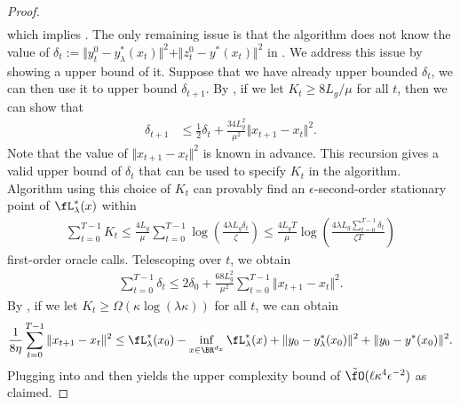 \begin{proof}
\begin{align}
\end{align}
which implies . The only remaining issue is that the algorithm does not know the value of $\delta_t:= \Vert y_t^0 - y_{\lambda}^*(x_t) \Vert^2 + \Vert z_t^0 - y^*(x_t) \Vert^2  $ in . We address this issue by showing a upper bound of it.
Suppose that we have already upper bounded $\delta_t$, we can then use it to upper bound $\delta_{t+1}$.
By , if we let $K_t \ge 8L_g/\mu$ for all $t$, then we can show that
\begin{align*} 
     \delta_{t+1}
    &\le \frac{1}{2} \delta_t +\frac{34 L_g^2}{\mu^2} \Vert x_{t+1} - x_t \Vert^2.
\end{align*}
Note that the value of $\Vert x_{t+1} - x_t \Vert^2$ is known in advance. This recursion gives a valid upper bound of $\delta_t$ that can be used to specify $K_t$ in the algorithm. 
Algorithm using this choice of $K_t$ can provably find an $\epsilon$-second-order stationary point of $\fL_{\lambda}^*(x)$ within 
\begin{align} \label{plug:2}
\sum_{t=0}^{T-1} K_t \le \frac{4L_g}{\mu} \sum_{t=0}^{T-1} \log \left( 
\frac{4 \lambda L_g \delta_t}{\zeta}
\right)   \le \frac{4L_g T}{\mu} \log \left( \frac{4 \lambda L_g \sum_{t=0}^{T-1}\delta_t}{\zeta T} \right)
\end{align}
 first-order oracle calls.
Telescoping over $t$, we obtain
\begin{align} \label{plug:1}
    \sum_{t=0}^{T-1} \delta_{t} \le 2 \delta_0 + \frac{68L_g^2}{\mu^2} \sum_{t=0}^{T-1} \Vert x_{t+1} - x_t \Vert^2.
\end{align}
By , if we let $K_t \ge \Omega( \kappa \log(\lambda \kappa))$ for all $t$, we can obtain
\begin{align*}
\frac{1}{8 \eta} \sum_{t=0}^{T-1} \Vert x_{t+1} - x_t \Vert^2 \le \fL_{\lambda}^*(x_0) - \inf_{x \in \BR^{d_x}} \fL_{\lambda}^*(x) + \Vert y_0 - y_{\lambda}^*(x_0) \Vert^2 + \Vert y_0 - y^*(x_0) \Vert^2 .
\end{align*}
Plugging into  and then  yields the upper complexity bound of $\tilde \fO(\ell \kappa^4 \epsilon^{-2})$ as claimed. 
\end{proof}



